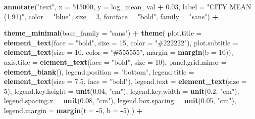 \documentclass[
]{article}
\newenvironment{Shaded}{\begin{snugshade}}{\end{snugshade}}
\newcommand{\AttributeTok}[1]{\textcolor[rgb]{0.13,0.29,0.53}{#1}}
\newcommand{\DecValTok}[1]{\textcolor[rgb]{0.00,0.00,0.81}{#1}}
\newcommand{\FloatTok}[1]{\textcolor[rgb]{0.00,0.00,0.81}{#1}}
\newcommand{\FunctionTok}[1]{\textcolor[rgb]{0.13,0.29,0.53}{\textbf{#1}}}
\newcommand{\NormalTok}[1]{#1}
\newcommand{\SpecialCharTok}[1]{\textcolor[rgb]{0.81,0.36,0.00}{\textbf{#1}}}
\newcommand{\StringTok}[1]{\textcolor[rgb]{0.31,0.60,0.02}{#1}}
\begin{document}
\begin{Shaded}
\begin{Highlighting}[]
  \FunctionTok{annotate}\NormalTok{(}\StringTok{"text"}\NormalTok{, }\AttributeTok{x =} \DecValTok{515000}\NormalTok{, }\AttributeTok{y =}\NormalTok{ log\_mean\_val }\SpecialCharTok{+} \FloatTok{0.03}\NormalTok{,}
           \AttributeTok{label =} \StringTok{"CITY MEAN (1.91)"}\NormalTok{, }\AttributeTok{color =} \StringTok{"blue"}\NormalTok{,}
           \AttributeTok{size =} \DecValTok{3}\NormalTok{, }\AttributeTok{fontface =} \StringTok{"bold"}\NormalTok{, }\AttributeTok{family =} \StringTok{"sans"}\NormalTok{) }\SpecialCharTok{+}

  \FunctionTok{theme\_minimal}\NormalTok{(}\AttributeTok{base\_family =} \StringTok{"sans"}\NormalTok{) }\SpecialCharTok{+}
  \FunctionTok{theme}\NormalTok{(}
    \AttributeTok{plot.title =} \FunctionTok{element\_text}\NormalTok{(}\AttributeTok{face =} \StringTok{"bold"}\NormalTok{, }\AttributeTok{size =} \DecValTok{15}\NormalTok{, }\AttributeTok{color =} \StringTok{"\#222222"}\NormalTok{),}
    \AttributeTok{plot.subtitle =} \FunctionTok{element\_text}\NormalTok{(}\AttributeTok{size =} \DecValTok{10}\NormalTok{, }\AttributeTok{color =} \StringTok{"\#555555"}\NormalTok{, }\AttributeTok{margin =} \FunctionTok{margin}\NormalTok{(}\AttributeTok{b =} \DecValTok{10}\NormalTok{)),}
    \AttributeTok{axis.title =} \FunctionTok{element\_text}\NormalTok{(}\AttributeTok{face =} \StringTok{"bold"}\NormalTok{, }\AttributeTok{size =} \DecValTok{10}\NormalTok{),}
    \AttributeTok{panel.grid.minor =} \FunctionTok{element\_blank}\NormalTok{(),}
    \AttributeTok{legend.position =} \StringTok{"bottom"}\NormalTok{,}
    \AttributeTok{legend.title =} \FunctionTok{element\_text}\NormalTok{(}\AttributeTok{size =} \FloatTok{7.5}\NormalTok{, }\AttributeTok{face =} \StringTok{"bold"}\NormalTok{),}
    \AttributeTok{legend.text =} \FunctionTok{element\_text}\NormalTok{(}\AttributeTok{size =} \DecValTok{5}\NormalTok{),}
    \AttributeTok{legend.key.height =} \FunctionTok{unit}\NormalTok{(}\FloatTok{0.04}\NormalTok{, }\StringTok{"cm"}\NormalTok{),}
    \AttributeTok{legend.key.width =} \FunctionTok{unit}\NormalTok{(}\FloatTok{0.2}\NormalTok{, }\StringTok{"cm"}\NormalTok{),}
    \AttributeTok{legend.spacing.x =} \FunctionTok{unit}\NormalTok{(}\FloatTok{0.08}\NormalTok{, }\StringTok{"cm"}\NormalTok{),}
    \AttributeTok{legend.box.spacing =} \FunctionTok{unit}\NormalTok{(}\FloatTok{0.05}\NormalTok{, }\StringTok{"cm"}\NormalTok{),}
    \AttributeTok{legend.margin =} \FunctionTok{margin}\NormalTok{(}\AttributeTok{t =} \SpecialCharTok{{-}}\DecValTok{5}\NormalTok{, }\AttributeTok{b =} \SpecialCharTok{{-}}\DecValTok{5}\NormalTok{)}
\NormalTok{  ) }\SpecialCharTok{+}


\end{Highlighting}
\end{Shaded}
\end{document}

